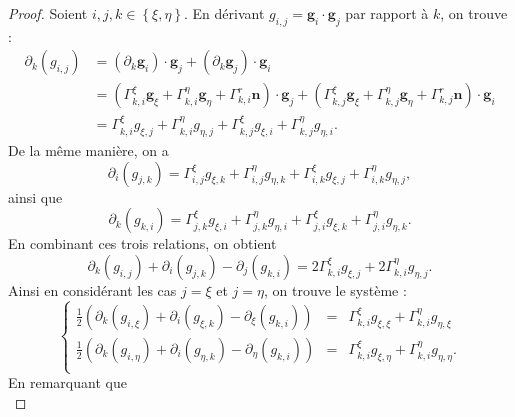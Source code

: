 \begin{proof}
Soient $i,j, k  \in \left\lbrace \xi, \eta \right\rbrace$. En dérivant $g_{i,j} = \mathbf{g}_i \cdot \mathbf{g}_j$ par rapport à $k$, on trouve :
\begin{align*}
\partial_k (g_{i,j}) & = (\partial_k \mathbf{g}_i ) \cdot \mathbf{g}_j + (\partial_k \mathbf{g}_j ) \cdot \mathbf{g}_i\\
	& = \left( \Gamma_{k,i}^{\xi} \mathbf{g}_{\xi} + \Gamma_{k,i}^{\eta} \mathbf{g}_{\eta} + \Gamma_{k,i}^{r} \textbf{n} \right) \cdot \mathbf{g}_j + \left( \Gamma_{k,j}^{\xi} \mathbf{g}_{\xi} + \Gamma_{k,j}^{\eta} \mathbf{g}_{\eta} + \Gamma_{k,j}^{r} \textbf{n} \right) \cdot \mathbf{g}_i \\
	& = \Gamma_{k,i}^{\xi} g_{\xi,j} + \Gamma_{k,i}^{\eta} g_{\eta,j} + \Gamma_{k,j}^{\xi} g_{\xi,i} + \Gamma_{k,j}^{\eta} g_{\eta,i} .
\end{align*}
De la même manière, on a 
\begin{equation}
\partial_i (g_{j,k}) = \Gamma_{i,j}^{\xi} g_{\xi,k} + \Gamma_{i,j}^{\eta} g_{\eta,k} + \Gamma_{i,k}^{\xi} g_{\xi,j} + \Gamma_{i,k}^{\eta} g_{\eta,j},
\end{equation}
ainsi que
\begin{equation}
\partial_k (g_{k,i}) = \Gamma_{j,k}^{\xi} g_{\xi,i} + \Gamma_{j,k}^{\eta} g_{\eta,i} + \Gamma_{j,i}^{\xi} g_{\xi,k} + \Gamma_{j,i}^{\eta} g_{\eta,k}.
\end{equation}
En combinant ces trois relations, on obtient
\begin{equation}
\partial_k (g_{i,j}) + \partial_i (g_{j,k}) - \partial_j (g_{k,i}) = 2 \Gamma_{k,i}^{\xi} g_{\xi,j} + 2 \Gamma_{k,i}^{\eta} g_{\eta,j}.
\end{equation}
Ainsi en considérant les cas $j=\xi$ et $j=\eta$, on trouve le système :
\begin{equation}
\left\lbrace
\begin{array}{rcl}
\frac{1}{2} \left( \partial_k (g_{i,\xi}) + \partial_i (g_{\xi,k}) - \partial_{\xi} (g_{k,i}) \right) & = & \Gamma_{k,i}^{\xi} g_{\xi,\xi} + \Gamma_{k,i}^{\eta} g_{\eta,\xi} \\
\frac{1}{2} \left( \partial_k (g_{i,\eta}) + \partial_i (g_{\eta,k}) - \partial_{\eta} (g_{k,i}) \right) & = & \Gamma_{k,i}^{\xi} g_{\xi,\eta} + \Gamma_{k,i}^{\eta} g_{\eta,\eta}. \\
\end{array}
\right.
\end{equation}
En remarquant que
\begin{equation}

\end{equation}
\end{proof}
